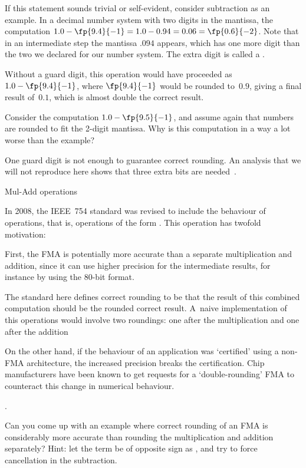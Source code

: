 If this statement sounds trivial or self-evident, consider subtraction
as an example. In a decimal number system with two digits in the
mantissa, the computation
$1.0-\fp{9.4}{-1}=1.0-0.94=0.06=\fp{0.6}{-2}$. Note that in an
intermediate step the mantissa $.094$ appears, which has one more
digit than the two we declared for our number system. The extra digit
is called a .

Without a guard digit, this operation would have proceeded as
$1.0-\fp{9.4}{-1}$, where $\fp{9.4}{-1}$ would be rounded to~$0.9$,
giving a final result of~$0.1$, which is almost double the correct result.
\begin{exercise}
  Consider the computation $1.0-\fp{9.5}{-1}$, and assume again that
  numbers are rounded to fit the 2-digit mantissa. Why is this
  computation in a way a lot worse than the example?
\end{exercise}
One guard digit is not enough to guarantee correct rounding. An
analysis that we will not reproduce here shows that three extra bits
are needed~\cite{Goldberg:arithmetic}.

 {Mul-Add operations}

In 2008, the IEEE~754 standard was revised to include the behaviour
of  operations, that is, operations of the
form . This operation has twofold motivation:

First, the \ac{FMA} is potentially more accurate than a separate
multiplication and addition, since it can use higher precision for the
intermediate results, for instance by using the 80-bit
 format.

The standard here defines correct rounding to be that the result of
this combined computation should be the rounded correct
result. A~naive implementation of this operations would involve two
roundings: one after the multiplication and one after the
addition
\begin{footnoteenv}
  {On the other hand, if the behaviour of an
  application was `certified' using a non-FMA architecture, the
  increased precision breaks the certification. Chip manufacturers
  have been known to get requests for a `double-rounding' FMA to
  counteract this change in numerical behaviour.}
\end{footnoteenv}
.


\begin{exercise}
  Can you come up with an example where correct rounding of
  an \ac{FMA} is considerably more accurate than rounding the
  multiplication and addition separately? Hint: let the  term be
  of opposite sign as , and try to force cancellation in the
  subtraction.
\end{exercise}

